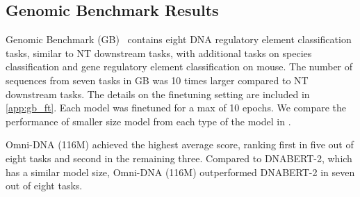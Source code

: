 
\subsection{Genomic Benchmark Results}
Genomic Benchmark (GB)~\cite{grevsova2023genomic} contains eight DNA regulatory element classification tasks, similar to NT downstream tasks, with additional tasks on species classification and gene regulatory element classification on mouse. The number of sequences from seven tasks in GB was 10 times larger compared to NT downstream tasks. The details on the finetuning setting are included in \cref{app:gb_ft}. Each model was finetuned for a max of 10 epochs. We compare the performance of smaller size model from each type of the model in . 

Omni-DNA (116M) achieved the highest average score, ranking first in five out of eight tasks and second in the remaining three. Compared to DNABERT-2, which has a similar model size, Omni-DNA (116M) outperformed DNABERT-2 in seven out of eight tasks.

